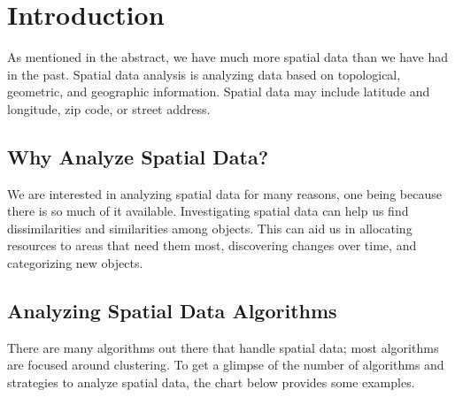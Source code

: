 \documentclass[12pt,twoside]{amherstthesis}
\begin{document}
  \onehalfspacing
  
  \chapter*{Introduction}\label{introduction}
  
  As mentioned in the abstract, we have much more spatial data than we
  have had in the past. Spatial data analysis is analyzing data based on
  topological, geometric, and geographic information. Spatial data may
  include latitude and longitude, zip code, or street address.
  
  \section{Why Analyze Spatial Data?}\label{why-analyze-spatial-data}
  
  We are interested in analyzing spatial data for many reasons, one being
  because there is so much of it available. Investigating spatial data can
  help us find dissimilarities and similarities among objects. This can
  aid us in allocating resources to areas that need them most, discovering
  changes over time, and categorizing new objects.
  
  \section{Analyzing Spatial Data
  Algorithms}\label{analyzing-spatial-data-algorithms}
  
  There are many algorithms out there that handle spatial data; most
  algorithms are focused around clustering. To get a glimpse of the number
  of algorithms and strategies to analyze spatial data, the chart below
  provides some examples.
  
  \begin{Shaded}
  \begin{Highlighting}[]
  \NormalTok{(} \NormalTok{, }
         \NormalTok{, }
         \NormalTok{, } \NormalTok{, } \NormalTok{)}
  \end{Highlighting}
  \end{Shaded}
  
\end{document}

